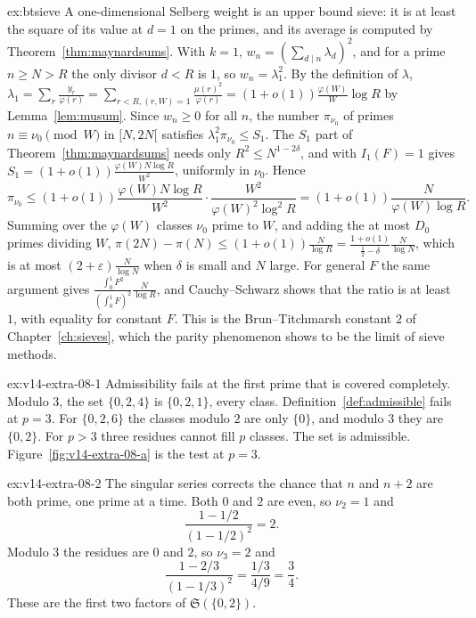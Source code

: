 \begin{solution}{ex:btsieve}
\idea A one-dimensional Selberg weight is an upper bound sieve: it is at least the square of its value at $d=1$ on the primes, and its average is computed by Theorem~\ref{thm:maynardsums}.
\writeup With $k=1$, $w_n=(\sum_{d\mid n}\lambda_d)^2$, and for a prime $n\ge N>R$ the only divisor $d<R$ is $1$, so $w_n=\lambda_1^2$. By the definition of $\lambda$, $\lambda_1=\sum_r\frac{y_r}{\varphi(r)}=\sum_{r<R,(r,W)=1}\frac{\mu(r)^2}{\varphi(r)}=(1+o(1))\frac{\varphi(W)}W\log R$ by Lemma~\ref{lem:musum}. Since $w_n\ge0$ for all $n$, the number $\pi_{\nu_0}$ of primes $n\equiv\nu_0\pmod W$ in $[N,2N[$ satisfies $\lambda_1^2\pi_{\nu_0}\le S_1$. The $S_1$ part of Theorem~\ref{thm:maynardsums} needs only $R^2\le N^{1-2\delta}$, and with $I_1(F)=1$ gives $S_1=(1+o(1))\frac{\varphi(W)N\log R}{W^2}$, uniformly in $\nu_0$. Hence
\[
\pi_{\nu_0}\le(1+o(1))\frac{\varphi(W)N\log R}{W^2}\cdot\frac{W^2}{\varphi(W)^2\log^2R}=(1+o(1))\frac N{\varphi(W)\log R}.
\]
Summing over the $\varphi(W)$ classes $\nu_0$ prime to $W$, and adding the at most $D_0$ primes dividing $W$, $\pi(2N)-\pi(N)\le(1+o(1))\frac N{\log R}=\frac{1+o(1)}{\frac12-\delta}\frac N{\log N}$, which is at most $(2+\varepsilon)\frac N{\log N}$ when $\delta$ is small and $N$ large. For general $F$ the same argument gives $\frac{\int_0^1F^2}{(\int_0^1F)^2}\frac N{\log R}$, and Cauchy--Schwarz shows that the ratio is at least $1$, with equality for constant $F$. This is the Brun--Titchmarsh constant $2$ of Chapter~\ref{ch:sieves}, which the parity phenomenon shows to be the limit of sieve methods.
\end{solution}

\begin{solution}{ex:v14-extra-08-1}
\idea Admissibility fails at the first prime that is covered completely.
\writeup Modulo $3$, the set $\{0,2,4\}$ is $\{0,2,1\}$, every class. Definition~\ref{def:admissible} fails at $p=3$. For $\{0,2,6\}$ the classes modulo $2$ are only $\{0\}$, and modulo $3$ they are $\{0,2\}$. For $p>3$ three residues cannot fill $p$ classes. The set is admissible. Figure~\ref{fig:v14-extra-08-a} is the test at $p=3$.
\end{solution}

\begin{solution}{ex:v14-extra-08-2}
\idea The singular series corrects the chance that $n$ and $n+2$ are both prime, one prime at a time.
\writeup Both $0$ and $2$ are even, so $\nu_2=1$ and
\[
\frac{1-1/2}{(1-1/2)^2}=2.
\]
Modulo $3$ the residues are $0$ and $2$, so $\nu_3=2$ and
\[
\frac{1-2/3}{(1-1/3)^2}=\frac{1/3}{4/9}=\frac34.
\]
These are the first two factors of $\mathfrak S(\{0,2\})$.
\end{solution}

